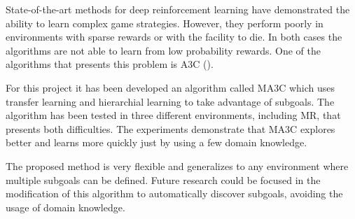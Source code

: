 
State-of-the-art methods for deep reinforcement learning have demonstrated the ability to learn complex game strategies.
However, they perform poorly in environments with sparse rewards or with the facility to die.
In both cases the algorithms are not able to learn from low probability rewards.
One of the algorithms that presents this problem is \acf{A3C} (\cite{mnih2016A3C}).

For this project it has been developed an algorithm called \acf{MA3C} which uses transfer learning and hierarchial learning
to take advantage of subgoals.
The algorithm has been tested in three different environments, including \acl{MR}, that presents both difficulties.
The experiments demonstrate that \ac{MA3C} explores better and learns more quickly just by using a few domain knowledge.

The proposed method is very flexible and generalizes to any environment where multiple subgoals can be defined.
Future research could be focused in the modification of this algorithm to automatically discover subgoals,
avoiding the usage of domain knowledge.